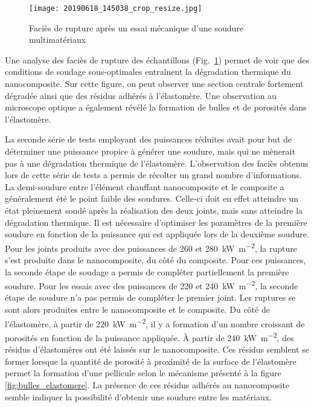 \begin{figure}[h]
	\centering
	\texttt{[image: 20190618\_145038\_crop\_resize.jpg]}
	\caption{Faciès de rupture après un essai mécanique d'une soudure multimatériaux}
	\label{fig:facies_multi_materiau}
\end{figure}

Une analyse des faciès de rupture des échantillons (Fig.~\ref{fig:facies_multi_materiau}) permet de voir que des conditions de soudage sous-optimales entraînent la dégradation thermique du nanocomposite. 
Sur cette figure, on peut observer une section centrale fortement dégradée ainsi que des résidus adhérés à l'élastomère. 
Une observation au microscope optique a également révélé la formation de bulles et de porosités dans l'élastomère. 

La seconde série de tests employant des puissances réduites avait pour but de déterminer une puissance propice à générer une soudure, mais qui ne mènerait pas à une dégradation thermique de l'élastomère. 
L'observation des faciès obtenus lors de cette série de tests a permis de récolter un grand nombre d'informations. 
La demi-soudure entre l'élément chauffant nanocomposite et le composite a généralement été le point faible des soudures. 
Celle-ci doit en effet atteindre un état pleinement soudé après la réalisation des deux joints, mais sans atteindre la dégradation thermique. 
Il est nécessaire d'optimiser les paramètres de la première soudure en fonction de la puissance qui est appliquée lors de la deuxième soudure. 
Pour les joints produits avec des puissances de 260 et \SI[locale=FR]{280}{\kilo\watt\per\square\metre}, la rupture s'est produite dans le nanocomposite, du côté du composite. 
Pour ces puissances, la seconde étape de soudage a permis de compléter partiellement la première soudure. 
Pour les essais avec des puissances de 220 et \SI[locale=FR]{240}{\kilo\watt\per\square\metre}, la seconde étape de soudure n'a pas permis de compléter le premier joint.
Les ruptures se sont alors produites entre le nanocomposite et le composite. 
Du côté de l'élastomère, à partir de \SI[locale=FR]{220}{\kilo\watt\per\square\metre}, il y a formation d'un nombre croissant de porosités en fonction de la puissance appliquée. 
À partir de \SI[locale=FR]{240}{\kilo\watt\per\square\metre}, des résidus d'élastomères ont été laissés sur le nanocomposite. 
Ces résidus semblent se former lorsque la quantité de porosité à proximité de la surface de l'élastomère permet la formation d'une pellicule selon le mécanisme présenté à la figure \ref{fig:bulles_elastomere}. 
La présence de ces résidus adhérés au nanocomposite semble indiquer la possibilité d'obtenir une soudure entre les matériaux. 

